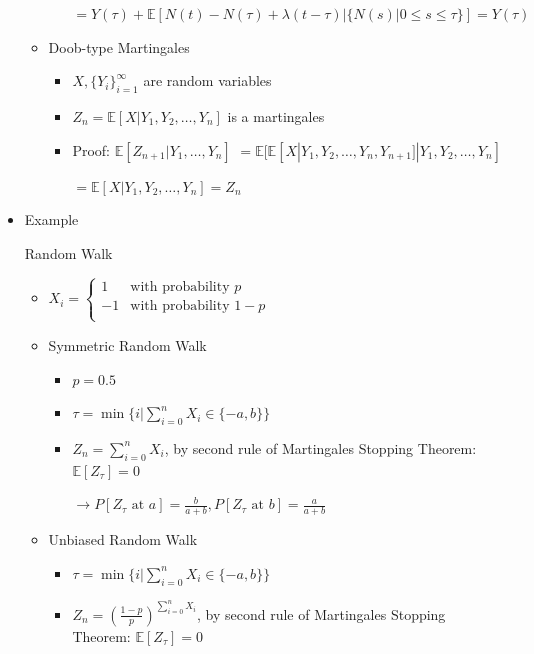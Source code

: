 \documentclass[a4paper]{article}
\begin{document}
\begin{itemize}
\begin{itemize}
\begin{itemize}
                        $= Y(\tau) + \mathbb{E}[N(t) - N(\tau) + \lambda(t - \tau)| \{N(s) | 0 \leq s \leq \tau\}] = Y(\tau)$
                \end{itemize}
            \item Doob-type Martingales
                \begin{itemize}
                    \item $X, \{Y_i\}_{i=1}^\infty$ are random variables
                    \item $Z_n = \mathbb{E}[X|Y_1, Y_2, \dots, Y_n]$ is a martingales
                    \item Proof: $\mathbb{E}[Z_{n+1}| Y_1, \dots, Y_n]$
                        $= \mathbb{E}[\mathbb{E}[X|Y_1, Y_2, \dots, Y_n, Y_{n+1}]| Y_1, Y_2, \dots, Y_n]$

                        $= \mathbb{E}[X| Y_1, Y_2, \dots, Y_n] = Z_n$
                \end{itemize}
        \end{itemize}
    \item Example

        Random Walk
        \begin{itemize}
            \item $X_i = \left\{ \begin{array}{ll}
                        1 & \text{with probability } p \\ 
                        -1 & \text{with probability } 1-p \\ 
                    \end{array} \right.$
            \item Symmetric Random Walk
                \begin{itemize}
                    \item $p = 0.5$
                    \item $\tau = \min\{i|\sum_{i=0}^n X_i \in \{-a, b\}\}$
                    \item $Z_n = \sum_{i=0}^n X_i$, by second rule of Martingales Stopping Theorem: $\mathbb{E}[Z_\tau] = 0$

                        $\rightarrow P[Z_\tau \text{ at }a ] = \frac{b}{a+b}, P[Z_\tau \text{ at }b ] = \frac{a}{a+b}$
                \end{itemize}
            \item Unbiased Random Walk
                \begin{itemize}
                    \item $\tau = \min\{i|\sum_{i=0}^n X_i \in \{-a, b\}\}$
                    \item $Z_n = (\frac{1-p}{p})^{\sum_{i=0}^n X_i}$, by second rule of Martingales Stopping Theorem: $\mathbb{E}[Z_\tau] = 0$


\end{itemize}
\end{itemize}
\end{itemize}
\end{document}
